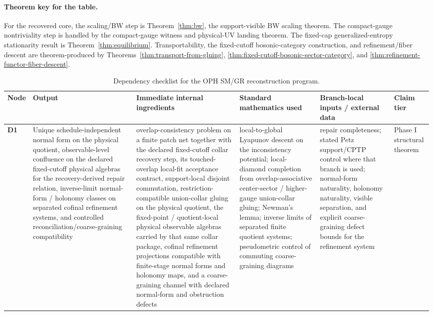 \documentclass[11pt]{article}
\begin{document}
\paragraph{Theorem key for the table.}
For the recovered core, the scaling/BW step is Theorem~\ref{thm:bw}, the support-visible BW scaling theorem. The compact-gauge nontriviality step is handled by the compact-gauge witness and physical-UV landing theorem. The fixed-cap generalized-entropy stationarity result is Theorem~\ref{thm:equilibrium}. Transportability, the fixed-cutoff bosonic-category construction, and refinement/fiber descent are theorem-produced by Theorems~\ref{thm:transport-from-gluing}, \ref{thm:fixed-cutoff-bosonic-sector-category}, and \ref{thm:refinement-functor-fiber-descent}.

\begingroup
\tiny
\setlength{\tabcolsep}{1pt}
\begin{longtable}{@{}>{\raggedright\arraybackslash}p{}>{\raggedright\arraybackslash}p{}>{\raggedright\arraybackslash}p{}>{\raggedright\arraybackslash}p{}>{\raggedright\arraybackslash}p{}>{\raggedright\arraybackslash}p{}@{}}
\caption{Dependency checklist for the OPH SM/GR reconstruction program.}\\
\toprule
Node & Output & Immediate internal ingredients & Standard mathematics used & Branch-local inputs / external data & Claim tier \\
\midrule
\endhead
\bottomrule
\endfoot
\textbf{D1} & Unique schedule-independent normal form on the physical quotient, observable-level confluence on the declared fixed-cutoff physical algebras for the recovery-derived repair relation, inverse-limit normal-form / holonomy classes on separated cofinal refinement systems, and controlled reconciliation/coarse-graining compatibility & overlap-consistency problem on a finite patch net together with the declared fixed-cutoff collar recovery step, its touched-overlap local-fit acceptance contract, support-local disjoint commutation, restriction-compatible union-collar gluing on the physical quotient, the fixed-point / quotient-local physical observable algebras carried by that same collar package, cofinal refinement projections compatible with finite-stage normal forms and holonomy maps, and a coarse-graining channel with declared normal-form and obstruction defects & local-to-global Lyapunov descent on the inconsistency potential; local-diamond completion from overlap-associative center-sector / higher-gauge union-collar gluing; Newman's lemma; inverse limits of separated finite quotient systems; pseudometric control of commuting coarse-graining diagrams & repair completeness; stated Petz support/CPTP control where that branch is used; normal-form naturality, holonomy naturality, visible separation, and explicit coarse-graining defect bounds for the refinement system & Phase I structural theorem \\

\end{longtable}
\end{document}
